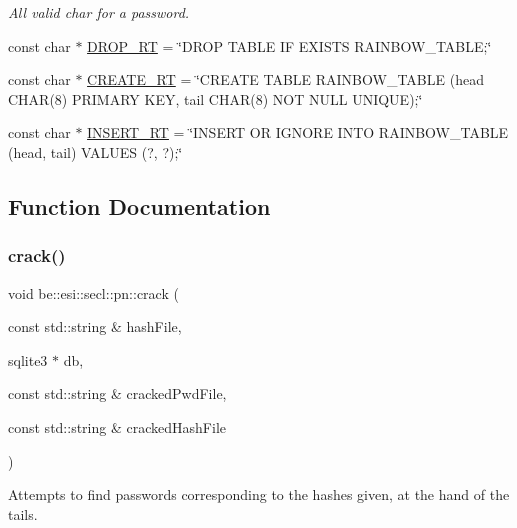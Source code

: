 \begin{DoxyCompactItemize}
\begin{DoxyCompactList}\small\item\em All valid char for a password. \end{DoxyCompactList}\item 
const char $\ast$ \hyperlink{namespacebe_1_1esi_1_1secl_1_1pn_a6dae14cb83aa871e50c9aaea7f776055}{D\+R\+O\+P\+\_\+\+RT} = \char`\"{}D\+R\+OP T\+A\+B\+LE IF E\+X\+I\+S\+TS R\+A\+I\+N\+B\+O\+W\+\_\+\+T\+A\+B\+LE;\char`\"{}
\item 
const char $\ast$ \hyperlink{namespacebe_1_1esi_1_1secl_1_1pn_ab39f379fcf2d9342096df70dcf998d32}{C\+R\+E\+A\+T\+E\+\_\+\+RT} = \char`\"{}C\+R\+E\+A\+TE T\+A\+B\+LE R\+A\+I\+N\+B\+O\+W\+\_\+\+T\+A\+B\+LE (head C\+H\+AR(8) P\+R\+I\+M\+A\+RY K\+EY, tail C\+H\+AR(8) N\+OT N\+U\+LL U\+N\+I\+Q\+UE);\char`\"{}
\item 
const char $\ast$ \hyperlink{namespacebe_1_1esi_1_1secl_1_1pn_a93b0970fb08c37d478307bfadfb3b775}{I\+N\+S\+E\+R\+T\+\_\+\+RT} = \char`\"{}I\+N\+S\+E\+RT OR I\+G\+N\+O\+RE I\+N\+TO R\+A\+I\+N\+B\+O\+W\+\_\+\+T\+A\+B\+LE (head, tail) V\+A\+L\+U\+ES (?, ?);\char`\"{}
\end{DoxyCompactItemize}


\subsection{Function Documentation}
\mbox{\label{namespacebe_1_1esi_1_1secl_1_1pn_aad832fb30fa4cc9e74d15d7129d0c929}} 
\subsubsection{\texorpdfstring{crack()}{crack()}}
{\footnotesize\ttfamily void be\+::esi\+::secl\+::pn\+::crack (\begin{DoxyParamCaption}\item[{const std\+::string \&}]{hash\+File,  }\item[{sqlite3 $\ast$}]{db,  }\item[{const std\+::string \&}]{cracked\+Pwd\+File,  }\item[{const std\+::string \&}]{cracked\+Hash\+File }\end{DoxyParamCaption})}



Attempts to find passwords corresponding to the hashes given, at the hand of the tails. 


